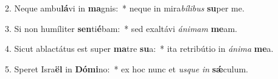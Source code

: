 2. Neque ambu\textbf{lá}vi in \textbf{ma}gnis:~*  neque in mira\textit{bí}\textit{li}\textit{bus} \textbf{su}per me.\

3. Si non humíliter \textbf{sen}ti\textbf{é}bam:~*  sed exaltávi \textit{á}\textit{ni}\textit{mam} \textbf{me}am.\

4. Sicut ablactátus est super \textbf{ma}tre \textbf{su}a:~*  ita retribútio in \textit{á}\textit{ni}\textit{ma} \textbf{me}a.\

5. Speret Isra\textbf{ël} in \textbf{Dó}\textbf{mi}no:~*  ex hoc nunc et \textit{us}\textit{que} \textit{in} \textbf{sǽ}culum.\

